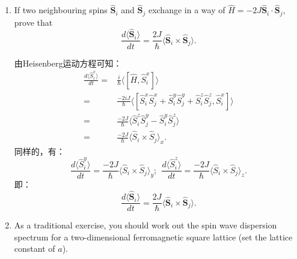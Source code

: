 \documentclass[reqno,a4paper,12pt]{amsart}
\begin{document}
\begin{enumerate}[1]
\item If two neighbouring spins $\hat{\textbf{S}}_i$ and $\hat{\textbf{S}}_j$ exchange in a way of $\hat{H} = -2J \hat{\textbf{S}}_i \cdot \hat{\textbf{S}}_j$, prove that 
\begin{equation}
	\frac{d \langle \hat{\textbf{S}}_i \rangle}{dt} = \frac{2J}{\hbar} \langle \hat{\textbf{S}}_i \times \hat{\textbf{S}}_j \rangle.
\end{equation}

\begin{tcolorbox}[colback = black!5!white, colframe = black]
由Heisenberg运动方程可知：
\begin{align*}
	\frac{d\langle \hat{S}_i^x \rangle}{dt} =& \frac{i}{\hbar} \langle [\hat{H}, \hat{S}_i^x] \rangle \\
	=& \frac{-2iJ}{\hbar} \langle [\hat{S}_i^x\hat{S}_j^x+\hat{S}_i^y\hat{S}_j^y+\hat{S}_i^z\hat{S}_j^z, \hat{S}_i^x] \rangle \\
	=& \frac{-2J}{\hbar} \langle \hat{S}_i^z\hat{S}_j^y - \hat{S}_i^y\hat{S}_j^z \rangle \\
	=& \frac{-2J}{\hbar} \langle \hat{S}_i \times \hat{S}_j \rangle_x.
\end{align*}
同样的，有：
\[
	\frac{d\langle \hat{S}_i^y \rangle}{dt} = \frac{-2J}{\hbar} \langle \hat{S}_i \times \hat{S}_j \rangle_y; ~~ \frac{d\langle \hat{S}_i^z \rangle}{dt} = \frac{-2J}{\hbar} \langle \hat{S}_i \times \hat{S}_j \rangle_z.
\]
即：
\[
	\frac{d\langle \hat{\mathbf{S}}_i \rangle}{dt} = \frac{2J}{\hbar} \langle \hat{\mathbf{S}}_i \times \hat{\mathbf{S}}_j \rangle.
\]
\end{tcolorbox}


\item As a traditional exercise, you should work out the spin wave dispersion spectrum for a two-dimensional ferromagnetic square lattice (set the lattice constant of $a$).


\end{enumerate}
\end{document}
